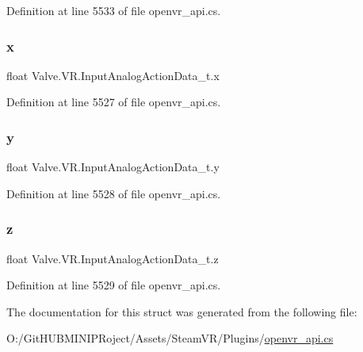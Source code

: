 Definition at line 5533 of file openvr\+\_\+api.\+cs.

\mbox{\label{struct_valve_1_1_v_r_1_1_input_analog_action_data__t_aedb24a586d83e3c15feb7fae7c54c9ed}} 
\subsubsection{\texorpdfstring{x}{x}}
{\footnotesize\ttfamily float Valve.\+V\+R.\+Input\+Analog\+Action\+Data\+\_\+t.\+x}



Definition at line 5527 of file openvr\+\_\+api.\+cs.

\mbox{\label{struct_valve_1_1_v_r_1_1_input_analog_action_data__t_aafaa2145f9aaf619ccf56f781df522e0}} 
\subsubsection{\texorpdfstring{y}{y}}
{\footnotesize\ttfamily float Valve.\+V\+R.\+Input\+Analog\+Action\+Data\+\_\+t.\+y}



Definition at line 5528 of file openvr\+\_\+api.\+cs.

\mbox{\label{struct_valve_1_1_v_r_1_1_input_analog_action_data__t_a047177250626bdbaaf1c9686c0fe951b}} 
\subsubsection{\texorpdfstring{z}{z}}
{\footnotesize\ttfamily float Valve.\+V\+R.\+Input\+Analog\+Action\+Data\+\_\+t.\+z}



Definition at line 5529 of file openvr\+\_\+api.\+cs.



The documentation for this struct was generated from the following file\+:\begin{DoxyCompactItemize}
\item 
O\+:/\+Git\+H\+U\+B\+M\+I\+N\+I\+P\+Roject/\+Assets/\+Steam\+V\+R/\+Plugins/\mbox{\hyperlink{openvr__api_8cs}{openvr\+\_\+api.\+cs}}\end{DoxyCompactItemize}

